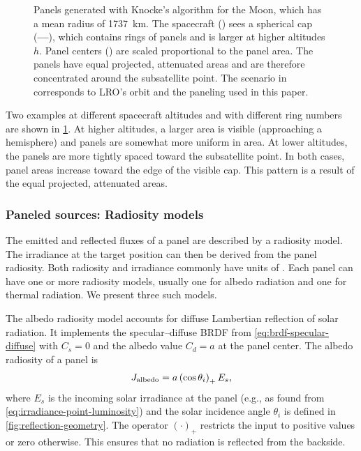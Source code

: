 \begin{figure}[t]
   \caption{Panels generated with Knocke's algorithm for the Moon, which has a mean radius of \qty{1737}{\km}. The spacecraft (\textcolor{mpl-pink}{}) sees a spherical cap (\textcolor{mpl-red}{\textbf{---}}), which contains rings of panels and is larger at higher altitudes $h$. Panel centers (\textcolor{mpl-lightblue}{}) are scaled proportional to the panel area. The panels have equal projected, attenuated areas and are therefore concentrated around the subsatellite point. The scenario in \protect{} corresponds to LRO's orbit and the paneling used in this paper.}
   \label{fig:general-knocke-paneling}
\end{figure}

Two examples at different spacecraft altitudes and with different ring numbers are shown in \cref{fig:general-knocke-paneling}. At higher altitudes, a larger area is visible (approaching a hemisphere) and panels are somewhat more uniform in area. At lower altitudes, the panels are more tightly spaced toward the subsatellite point. In both cases, panel areas increase toward the edge of the visible cap. This pattern is a result of the equal projected, attenuated areas.

\subsubsection{Paneled sources: Radiosity models}
The emitted and reflected fluxes of a panel are described by a radiosity model. The irradiance at the target position can then be derived from the panel radiosity. Both radiosity and irradiance commonly have units of \unit{\irr}. Each panel can have one or more radiosity models, usually one for albedo radiation and one for thermal radiation. We present three such models.

The albedo radiosity model accounts for diffuse Lambertian reflection of solar radiation. It implements the specular--diffuse \gls{BRDF} from \cref{eq:brdf-specular-diffuse} with $C_s = 0$ and the albedo value $C_d = a$ at the panel center. The albedo radiosity of a panel is~\cite{Knocke1988}
\begin{align}
    \label{eq:radiosity-albedo}
    J_\textnormal{albedo} = a \left(\cos\theta_i\right)_+ E_s,
\end{align}
where $E_s$ is the incoming solar irradiance at the panel (e.g., as found from \cref{eq:irradiance-point-luminosity}) and the solar incidence angle $\theta_i$ is defined in \cref{fig:reflection-geometry}. The operator $(\cdot)_+$ restricts the input to positive values or zero otherwise. This ensures that no radiation is reflected from the backside.

